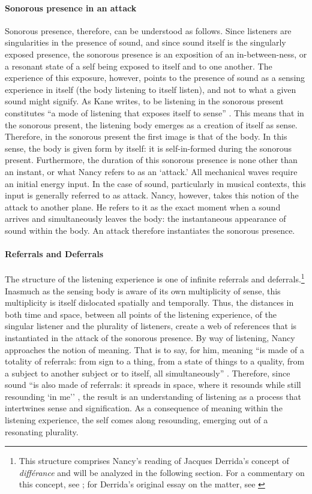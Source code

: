 \paragraph{Sonorous presence in an attack}
Sonorous presence, therefore, can be understood as follows. Since listeners are singularities in the presence of sound, and since sound itself is the singularly exposed presence, the sonorous presence is an exposition of an in-between-ness, or a resonant state of a self being exposed to itself and to one another. The experience of this exposure, however, points to the presence of sound as a sensing experience in itself (the body listening to itself listen), and not to what a given sound might signify. As Kane writes, to be listening in the sonorous present constitutes ``a mode of listening that exposes itself to sense'' \parencite[143-144]{Gra15:The}. This means that in the sonorous present, the listening body emerges as a creation of itself as sense. Therefore, in the sonorous present the first image is that of the body. In this sense, the body is given form by itself: it is self-in-formed during the sonorous present. Furthermore, the duration of this sonorous presence is none other than an instant, or what Nancy refers to as an `attack.' All mechanical waves require an initial energy input. In the case of sound, particularly in musical contexts, this input is generally referred to as attack. Nancy, however, takes this notion of the attack to another plane. He refers to it as the exact moment when a sound arrives and simultaneously leaves the body: the instantaneous appearance of sound within the body. An attack therefore instantiates the sonorous presence.

\paragraph{Referrals and Deferrals}
The structure of the listening experience is one of infinite referrals and deferrals.\footnote{This structure comprises Nancy's reading of Jacques Derrida's concept of \textit{différance} and will be analyzed in the following section. For a commentary on this concept, see \parencite[71-72]{Gra15:The}; for Derrida's original essay on the matter, see \parencite{Der78:Wri,Der82:Mar}} Inasmuch as the sensing body is aware of its own multiplicity of sense, this multiplicity is itself dislocated spatially and temporally. Thus, the distances in both time and space, between all points of the listening experience, of the singular listener and the plurality of listeners, create a web of references that is instantiated in the attack of the sonorous presence. By way of listening, Nancy approaches the notion of meaning. That is to say, for him, meaning ``is made of a totality of referrals: from sign to a thing, from a state of things to a quality, from a subject to another subject or to itself, all simultaneously'' \parencite[4-9]{Nan07:Lis}. Therefore, since sound  ``is also made of referrals: it spreads in space, where it resounds while still resounding `in me'' \parencite[4-9]{Nan07:Lis}, the result is an understanding of listening as a process that intertwines sense and signification. As a consequence of meaning within the listening experience, the self comes along resounding, emerging out of a resonating plurality.

